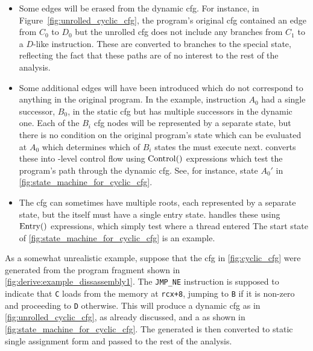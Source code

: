 \begin{itemize}
\item
  Some edges will be erased from the dynamic \gls{cfg}.  For instance,
  in Figure~\ref{fig:unrolled_cyclic_cfg}, the program's original
  \gls{cfg} contained an edge from $C_0$ to $D_0$ but the unrolled
  \gls{cfg} does not include any branches from $C_1$ to a $D$-like
  instruction.  These are converted to branches to the special
  {\stUnreached} state, reflecting the fact that these paths are of no
  interest to the rest of the analysis.
\item
  Some additional edges will have been introduced which do not
  correspond to anything in the original program.  In the example,
  instruction $A_0$ had a single successor, $B_0$, in the static
  \gls{cfg} but has multiple successors in the dynamic one.  Each of
  the $B_i$ \gls{cfg} nodes will be represented by a separate
  {\StateMachine} state, but there is no condition on the original
  program's state which can be evaluated at $A_0$ which determines
  which of $B_i$ states the {\StateMachine} must execute next.
  {\Technique} converts these into {\StateMachine}-level control flow
  using ${\mathrm{Control}}()$ expressions which test the program's
  path through the dynamic \gls{cfg}.  See, for instance, state $A_0'$
  in \autoref{fig:state_machine_for_cyclic_cfg}.
\item
  The \gls{cfg} can sometimes have multiple roots, each represented by
  a separate {\StateMachine} state, but the {\StateMachine} itself
  must have a single entry state.  {\Technique} handles these using
  $\mathrm{Entry}()$ expressions, which simply test where a thread entered
  The start state of \autoref{fig:state_machine_for_cyclic_cfg} is an
  example.
\end{itemize}
As a somewhat unrealistic example, suppose that the \gls{cfg} in
\autoref{fig:cyclic_cfg} were generated from the program fragment
shown in \autoref{fig:derive:example_dissassembly1}.  The
\verb|JMP_NE| instruction is supposed to indicate that \verb|C| loads
from the memory at \verb|rcx+8|, jumping to \verb|B| if it is non-zero
and proceeding to \verb|D| otherwise.  This will produce a dynamic
\gls{cfg} as in \autoref{fig:unrolled_cyclic_cfg}, as already
discussed, and a \StateMachine{} as shown in
\autoref{fig:state_machine_for_cyclic_cfg}.  The generated
\StateMachine{} is then converted to static single
assignment\cite{cytron1991} form and passed to
the rest of the analysis.

